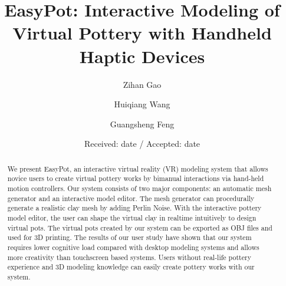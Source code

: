 \documentclass{svjour3}                     %
\begin{document}
\title{EasyPot: Interactive Modeling of Virtual Pottery with Handheld Haptic Devices
}


\author{Zihan Gao		\and
		Huiqiang Wang	\and
        Guangsheng Feng
}



\date{Received: date / Accepted: date}


\maketitle

\begin{abstract}
We present EasyPot, an interactive virtual reality (VR) modeling system that allows novice users to create virtual pottery works by bimanual interactions via hand-held motion controllers.
Our system consists of two major components: an automatic mesh generator and an interactive model editor.
The mesh generator can procedurally generate a realistic clay mesh by adding Perlin Noise. With the interactive pottery model editor, the user can shape the virtual clay in realtime intuitively to design virtual pots.
The virtual pots created by our system can be exported as OBJ files and used for 3D printing.
The results of our user study have shown that our system requires lower cognitive load compared with desktop modeling systems and allows more creativity than touchscreen based systems. Users without real-life pottery experience and 3D modeling knowledge can easily create pottery works with our system.

\end{abstract}
\end{document}

